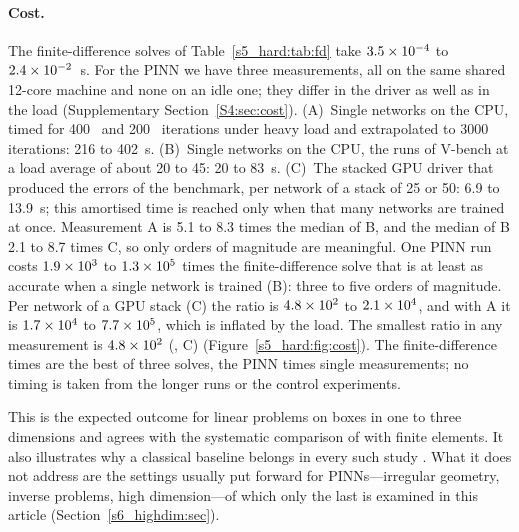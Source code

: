 \paragraph{Cost.}
The finite-difference solves of Table~\ref{s5_hard:tab:fd} take $3.5\times 10^{-4}$ to
$2.4\times 10^{-2}$~s.
For the PINN we have three measurements, all on the same shared 12-core machine and none
on an idle one; they differ in the driver as well as in the load
(Supplementary Section~\ref{S4:sec:cost}).
(A)~Single networks on the CPU, timed for 400 \Adam\ and 200 \LBFGS\ iterations under heavy
load and extrapolated to 3000 iterations: 216 to 402~s. (B)~Single networks on the CPU, the
runs of \textsf{V-bench} at a load average of about 20 to 45: 20 to 83~s. (C)~The stacked GPU
driver that produced the errors of the benchmark, per network of a stack of 25 or 50: 6.9 to
13.9~s; this amortised time is reached only when that many networks are trained at once.
Measurement A is 5.1 to 8.3 times the median of B, and the median of B 2.1 to 8.7 times C, so
only orders of magnitude are meaningful. One PINN run costs $1.9\times 10^{3}$ to $1.3\times 10^{5}$
times the finite-difference solve that is at least as accurate when a single network is
trained (B): three to five orders of magnitude. Per network of a GPU stack (C) the ratio is
$4.8\times 10^{2}$ to $2.1\times 10^{4}$, and with A it is $1.7\times 10^{4}$ to $7.7\times 10^{5}$, which is
inflated by the load. The smallest ratio in any measurement is $4.8\times 10^{2}$ (\PLtwo, C)
(Figure~\ref{s5_hard:fig:cost}). The finite-difference times are the best of three
solves, the PINN times single measurements; no timing is taken from the longer runs or the
control experiments.

This is the expected outcome for linear problems on boxes in one to three dimensions and
agrees with the systematic comparison of \citet{grossmann2024} with finite elements. It
also illustrates why a classical baseline belongs in every such study
\citep{mcgreivy2024}. What it does not address are the settings usually put forward for
PINNs---irregular geometry, inverse problems, high dimension---of which only the last is
examined in this article (Section~\ref{s6_highdim:sec}).
